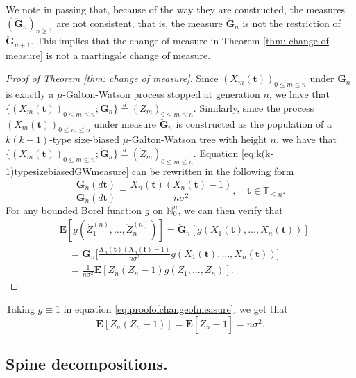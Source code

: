 \documentclass[12pt,a4paper]{amsart}
\numberwithin{equation}{section}
\begin{document}
	We note in passing that, because of the way they are constructed, the measures $(\ddot{\mathbf G}_n)_{n\ge 1}$ are not consistent, that is, the measure $\ddot{\mathbf G}_n$ is not the restriction of $\ddot{\mathbf G}_{n+1}$.
	This implies that the change of measure in Theorem \ref{thm: change of measure} is not a martingale change of measure.
\medskip
\begin{proof}[Proof of Theorem \ref{thm: change of measure}]
	Since $(X_m( \mathbf t ))_{0\le m\le n}$ under ${\mathbf G}_n$ is exactly a $\mu$-Galton-Watson process stopped at generation $n$, we have that $\{(X_m( \mathbf t ))_{0\le m\le n}; {\mathbf G}_n\}  \overset{d}{=} (Z_m)_{0\le m\le n}.$
    Similarly, since the process $(X_m( \mathbf t ))_{0\le m\le n}$ under measure $\ddot{\mathbf G}_n$ is constructed as the population of a $k(k-1)$-type size-biased $\mu$-Galton-Watson tree with height $n$, we have that $\{(X_m( \mathbf t ))_{0\le m\le n};\ddot{\mathbf G}_n\}  \overset{d}{=} (\ddot Z_m)_{0\le m\le n}.$
	Equation \eqref{eq:k(k-1)typesizebiasedGWmeasure} can be rewritten in the following form
\begin{equation*}
    	\frac{\ddot{\mathbf G}_n(d \mathbf t )}{\mathbf G_n (d \mathbf t ) }
    =
    	\frac{X_n( \mathbf t )(X_n( \mathbf t )-1)}{n\sigma^2},
    \quad
    	 \mathbf t \in \mathbb T_{\leq n}.
\end{equation*}
    For any bounded Borel function $g$ on $\mathbb N_0^n$, we can then verify that
\begin{equation} \label{eq:proofofchangeofmeasure}
\begin{split}
	&\mathbf E [ g ( \ddot Z_1^{(n)}, \dots, \ddot Z_n^{(n)})]
	= \ddot{\mathbf G}_n [g ( X_1(  \mathbf t ), \dots, X_n(  \mathbf t ))]
    \\ &\quad = {\mathbf G}_n \big[ \frac { X_n( \mathbf t ) ( X_n( \mathbf t ) - 1)} {n \sigma^2} g (X_1( \mathbf t ), \dots, X_n( \mathbf t ))\big]
	\\&\quad = \frac { 1} { n \sigma^2} \mathbf E[ Z_n ( Z_n - 1) g( Z_1, \dots, Z_n)].
\end{split}
\end{equation}
\end{proof}
	Taking $g\equiv 1$ in equation \eqref{eq:proofofchangeofmeasure}, we get that
\begin{equation}
	\label{eq: second moment}
	\mathbf E [Z_n(Z_n-1)]= \mathbf E [\dot Z_n - 1]= n\sigma^2.
\end{equation}
\subsection{Spine decompositions.}
\label{sec:spinesdecomposition}
\end{document}
